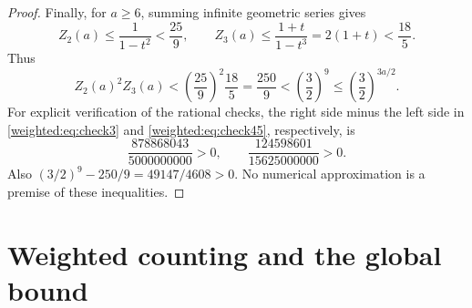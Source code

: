 \begin{proof}
Finally, for $a\ge6$, summing infinite geometric series gives
\[
Z_2(a)\le\frac1{1-t^2}<\frac{25}{9},\qquad
Z_3(a)\le\frac{1+t}{1-t^3}=2(1+t)<\frac{18}{5}.
\]
Thus
\begin{equation}\label{weighted:eq:check6}
Z_2(a)^2Z_3(a)<\left(\frac{25}{9}\right)^2\frac{18}{5}
=\frac{250}{9}<\left(\frac32\right)^9
\le\left(\frac32\right)^{3a/2}.
\end{equation}
For explicit verification of the rational checks, the right side minus the left side in \eqref{weighted:eq:check3} and \eqref{weighted:eq:check45}, respectively, is
\[
\frac{878868043}{5000000000}>0,
\qquad
\frac{124598601}{15625000000}>0.
\]
Also $(3/2)^9-250/9=49147/4608>0$. No numerical approximation is a premise of these inequalities.
\end{proof}


\section{Weighted counting and the global bound}
